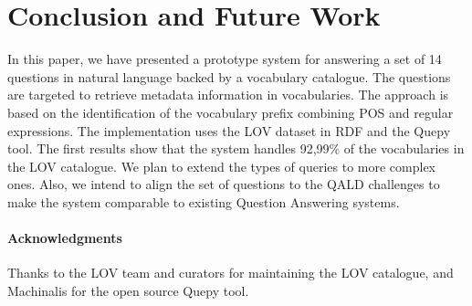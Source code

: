\documentclass[runningheads,a4paper]{llncs}
\begin{document}
\section{Conclusion and Future Work}
\label{sec:conclusion}
%

In this paper, we have presented a prototype system for answering a set of 14 questions in natural language backed by a vocabulary catalogue. The questions are targeted to retrieve metadata information in vocabularies. The approach is based on the identification of the vocabulary prefix combining POS and regular expressions. The implementation uses the LOV dataset in RDF and the Quepy tool. The first results show that the system handles 92,99\% of the vocabularies in the LOV catalogue. 
We plan to extend the types of queries to more complex ones. Also, we intend to align the set of questions to the QALD challenges to make the system comparable to existing Question Answering systems.  

\paragraph{\textbf{Acknowledgments}} %
Thanks to the LOV team and curators for maintaining the LOV catalogue, and Machinalis for the open source Quepy tool. 




\end{document}
